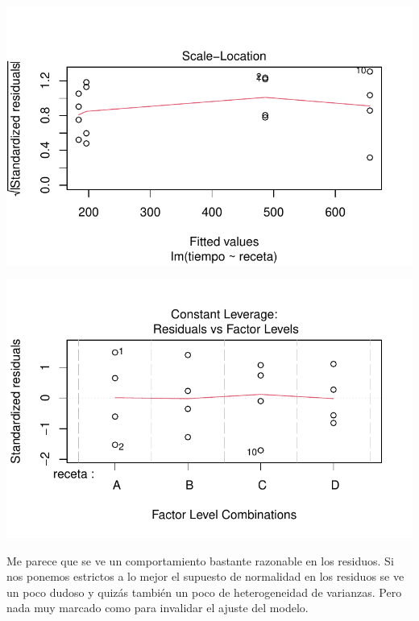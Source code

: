 \documentclass[
  letterpaper,
  DIV=11,
  numbers=noendperiod]{scrartcl}
\begin{document}
\includegraphics{solucion-masa-pizza_files/figure-pdf/graf-modelo-1-3.pdf}

\includegraphics{solucion-masa-pizza_files/figure-pdf/graf-modelo-1-4.pdf}

Me parece que se ve un comportamiento bastante razonable en los
residuos. Si nos ponemos estrictos a lo mejor el supuesto de normalidad
en los residuos se ve un poco dudoso y quizás también un poco de
heterogeneidad de varianzas. Pero nada muy marcado como para invalidar
el ajuste del modelo.
\end{document}
